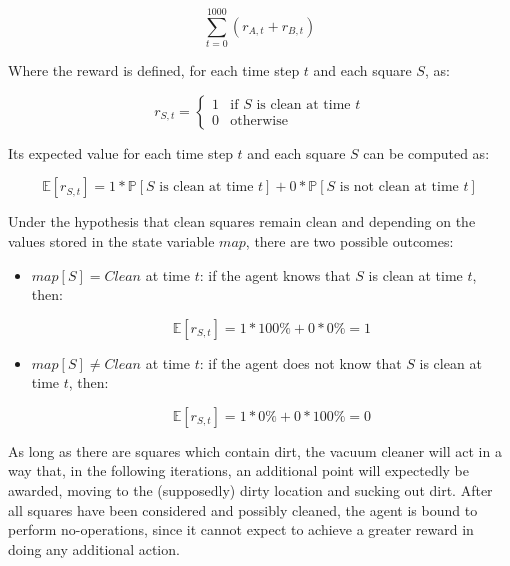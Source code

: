 \documentclass[letterpaper,headings=standardclasses]{scrartcl}
\begin{document}
$$ \sum_{t=0}^{1000} \left( r_{A,t} + r_{B,t} \right) $$

Where the reward is defined, for each time step $t$ and each square $S$, as:

$$ r_{S,t} = \begin{cases} 1 & \text{if } S \text{ is clean at time } t \\ 0 & \text{otherwise} \end{cases}$$

Its expected value for each time step $t$ and each square $S$ can be computed as:

$$ \mathbb{E} \left[ r_{S,t} \right] = 1 * \mathbb{P} \left[ S \text{ is clean at time } t \right] + 0 * \mathbb{P} \left[ S \text{ is not clean at time } t \right] $$

Under the hypothesis that clean squares remain clean and depending on the values stored in the state variable $map$, there are two possible outcomes:

\begin{itemize}

\item $map[S] = Clean$ at time $t$: if the agent knows that $S$ is clean at time $t$, then:

$$ \mathbb{E} \left[ r_{S,t} \right] = 1 * 100\% + 0 * 0\% = 1 $$

\item $map[S] \ne Clean$ at time $t$: if the agent does not know that $S$ is clean at time $t$, then:

$$ \mathbb{E} \left[ r_{S,t} \right] = 1 * 0\% + 0 * 100\% = 0 $$

\end{itemize}

As long as there are squares which contain dirt, the vacuum cleaner will act in a way that, in the following iterations, an additional point will expectedly be awarded, moving to the (supposedly) dirty location and sucking out dirt. After all squares have been considered and possibly cleaned, the agent is bound to perform no-operations, since it cannot expect to achieve a greater reward in doing any additional action.
\end{document}
